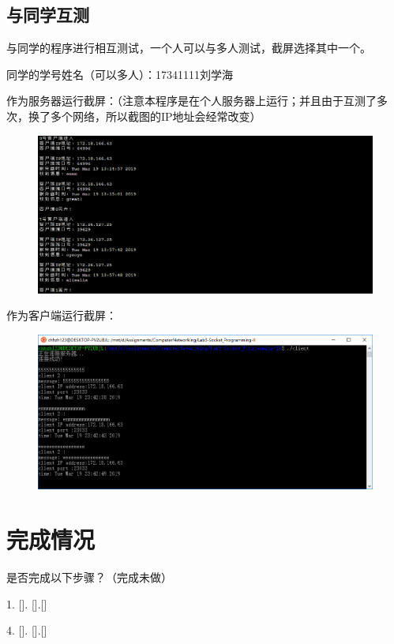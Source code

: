 \documentclass[logo,reportComp]{thesis}
\begin{document}
\subsection{与同学互测}
与同学的程序进行相互测试，一个人可以与多人测试，截屏选择其中一个。

同学的学号姓名（可以多人）：17341111刘学海

作为服务器运行截屏：（注意本程序是在个人服务器上运行；并且由于互测了多次，换了多个网络，所以截图的IP地址会经常改变）
\begin{figure}[H]
\centering
\includegraphics[width=\linewidth]{fig/cross-server.PNG}
\end{figure}

作为客户端运行截屏：
\begin{figure}[H]
\centering
\includegraphics[width=\linewidth]{fig/cross-client.PNG}
\end{figure}


\section{完成情况}
是否完成以下步骤？（\cmark 完成\quad\xmark 未做）
\par 1. [\cmark]. [\cmark].[\cmark]
\par 4. [\cmark]. [\cmark].[\cmark]
\end{document}
